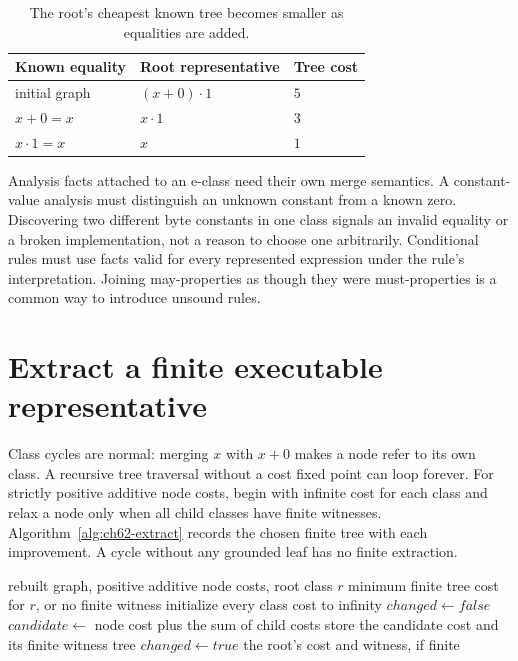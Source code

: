 \begin{table}[htbp]
\caption{The root's cheapest known tree becomes smaller as equalities are added.}
\label{tab:ch62-trace}
\centering
\begin{tabular}{lll}
\toprule
Known equality & Root representative & Tree cost \\
\midrule
initial graph & $(x+0)\cdot1$ & $5$ \\
$x+0=x$ & $x\cdot1$ & $3$ \\
$x\cdot1=x$ & $x$ & $1$ \\
\bottomrule
\end{tabular}
\end{table}

Analysis facts attached to an e-class need their own merge semantics.
A constant-value analysis must distinguish an unknown constant from a known zero.
Discovering two different byte constants in one class signals an invalid equality or a broken implementation, not a reason to choose one arbitrarily.
Conditional rules must use facts valid for every represented expression under the rule's interpretation.
Joining may-properties as though they were must-properties is a common way to introduce unsound rules.

\section{Extract a finite executable representative}
\label{sec:ch62-extraction}

Class cycles are normal: merging $x$ with $x+0$ makes a node refer to its own class.
A recursive tree traversal without a cost fixed point can loop forever.
For strictly positive additive node costs, begin with infinite cost for each class and relax a node only when all child classes have finite witnesses.
Algorithm~\ref{alg:ch62-extract} records the chosen finite tree with each improvement.
A cycle without any grounded leaf has no finite extraction.

\begin{algorithm}[htbp]
\caption{Extract a minimum-cost finite tree from a fixed e-graph.}
\label{alg:ch62-extract}
\begin{pseudocode}
\Require rebuilt graph, positive additive node costs, root class $r$
\Ensure minimum finite tree cost for $r$, or no finite witness
\State initialize every class cost to infinity
\Repeat
  \State $changed\gets false$
    \State $candidate\gets$ node cost plus the sum of child costs
      \State store the candidate cost and its finite witness tree
      \State $changed\gets true$
    \EndIf
  \EndFor
{}
\State \Return the root's cost and witness, if finite
\end{pseudocode}
\end{algorithm}

